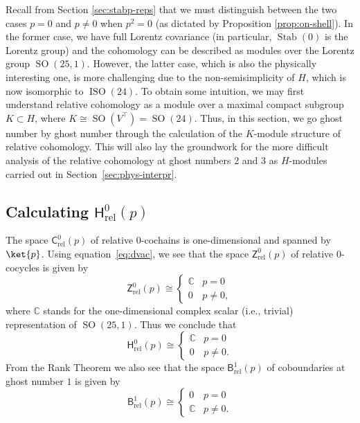 \documentclass[11pt,reqno,a4paper,final]{amsart}
\theoremstyle{plain}
\theoremstyle{definition}
\newcommand{\Crel}{\mathsf{C}_{\mathrm{rel}}} %
\newcommand{\Hrel}{\mathsf{H}_{\mathrm{rel}}}
\newcommand{\Brel}{\mathsf{B}_{\mathrm{rel}}}
\newcommand{\Zrel}{\mathsf{Z}_{\mathrm{rel}}}
\newcommand{\Stab}{\operatorname{Stab}}
\newcommand{\vac}{\ket{p}}
\newcommand{\CC}{\mathbb{C}}
\newcommand{\1}{\mathbb{1}}
\newcommand{\ISO}{\operatorname{ISO}}
\newcommand{\SO}{\operatorname{SO}}
\numberwithin{equation}{section}
\begin{document}
Recall from Section \ref{sec:stabp-reps} that we must distinguish
between the two cases $p = 0$ and $p \neq 0$ when $p^2 = 0$ (as
dictated by Proposition \ref{prop:on-shell}). In the former case, we
have full Lorentz covariance (in particular, $\Stab(0)$ is the Lorentz
group) and the cohomology can be described as modules over the Lorentz
group $\SO(25,1)$.  However, the latter case, which is also the physically
interesting one, is more challenging due to the non-semisimplicity of
$H$, which is now isomorphic to $\ISO(24)$. To obtain some intuition,
we may first understand relative cohomology as a module over a maximal
compact subgroup $K \subset H$, where $K \cong \SO(V^\top) =
\SO(24)$. Thus, in this section, we go ghost number by ghost number
through the calculation of the $K$-module structure of relative
cohomology. This will also lay the groundwork for the more difficult
analysis of the relative cohomology at ghost numbers 2 and 3 as
$H$-modules carried out in Section~\ref{sec:phys-interpr}.


\subsection{Calculating $\Hrel^0(p)$}
\label{sec:calculating-hrel0p}

The space $\Crel^0(p)$ of relative $0$-cochains is one-dimensional and
spanned by $\vac$.  Using equation~\eqref{eq:dvac}, we see that the
space $\Zrel^0(p)$ of relative $0$-cocycles is given by
\begin{equation}
  \Zrel^0(p) \cong
  \begin{cases}
    \CC & p=0\\
    0 & p \neq 0,
  \end{cases}
\end{equation}
where $\CC$ stands for the one-dimensional complex scalar (i.e.,
trivial) representation of $\SO(25,1)$.  Thus we conclude that
\begin{equation}
  \Hrel^0(p) \cong
  \begin{cases}
    \CC & p=0\\
    0 & p \neq 0.
  \end{cases}
\end{equation}
From the Rank Theorem we also see that the space $\Brel^1(p)$ of
coboundaries at ghost number $1$ is given by
\begin{equation}
  \label{eq:B1rel-as-reps}
  \Brel^1(p) \cong
  \begin{cases}
    0 & p = 0 \\
    \CC & p \neq 0.
  \end{cases}
\end{equation}
\end{document}

